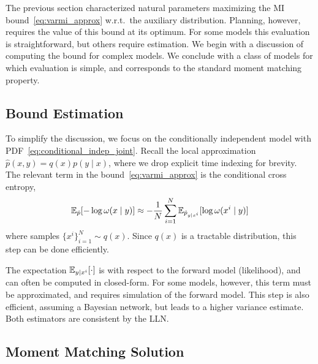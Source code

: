 The previous section characterized natural parameters maximizing the
MI bound~\eqref{eq:varmi_approx} w.r.t.~the auxiliary distribution.
Planning, however, requires the value of this bound at its optimum.
For some models this evaluation is straightforward, but others require
estimation.  We begin with a discussion of computing the bound for
complex models.  We conclude with a class of models for which
evaluation is simple, and corresponds to the standard moment matching
property.

\subsection{Bound Estimation}


To simplify the discussion, we focus on the conditionally independent
model with PDF~\eqref{eq:conditional_indep_joint}.  Recall the local
approximation $\hat{p}(x,y) = q(x)p(y\mid x)$, where we drop explicit
time indexing for brevity.  The relevant term in the
bound~\eqref{eq:varmi_approx} is the conditional cross
entropy,
\[
  \mathbb{E}_{\hat{p}}[ -\log \omega(x \mid y)
  ] \approx - \frac{1}{N} \sum_{i=1}^N \mathbb{E}_{\hat{p}_{y \mid
    x^i}}[ \log \omega(x^i \mid y) ]
\]
where samples $\{x^i\}_{i=1}^N \sim q(x)$.  Since $q(x)$ is a
tractable distribution, this step can be done efficiently.

The expectation $\mathbb{E}_{y\mid x^i}[\cdot]$ is with respect to the
forward model (likelihood), and can often be computed in closed-form.
For some models, however, this term must be approximated, and requires
simulation of the forward model.  This step is also efficient,
assuming a Bayesian network, but leads to a higher variance estimate.
Both estimators are consistent by the LLN.


\subsection{Moment Matching Solution}\label{sec:moment_match}

